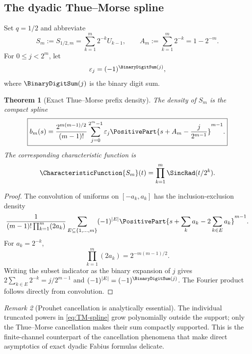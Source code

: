 \documentclass[11pt,oneside]{article}
\newtheorem{theorem}{Theorem}[section]
\theoremstyle{definition}
\theoremstyle{remark}
\newtheorem{remark}[theorem]{Remark}
\newcommand{\epsTM}{\varepsilon}
\begin{document}
\subsection{The dyadic Thue--Morse spline}

Set $q=1/2$ and abbreviate
\begin{equation}
 S_m:=S_{1/2,m}=\sum_{k=1}^{m}2^{-k}U_{k-1},
 \qquad A_m:=\sum_{k=1}^{m}2^{-k}=1-2^{-m}.
 \label{eq:dyadic-prefix}
\end{equation}
For $0\le j<2^m$, let
\begin{equation}
 \epsTM_j=(-1)^{\BinaryDigitSum(j)},
 \label{eq:TM-sign}
\end{equation}
where $\BinaryDigitSum(j)$ is the binary digit sum.

\begin{theorem}[Exact Thue--Morse prefix density]
\label{thm:TM-spline}
The density of $S_m$ is the compact spline
\begin{equation}
 \boxed{
 b_m(s)=\frac{2^{m(m-1)/2}}{(m-1)!}
 \sum_{j=0}^{2^m-1}\epsTM_j
 \PositivePart{s+A_m-\frac{j}{2^{m-1}}}^{m-1}.}
 \label{eq:TM-spline}
\end{equation}
The corresponding characteristic function is
\begin{equation}
 \CharacteristicFunction{S_m}(t)=\prod_{k=1}^{m}\SincRad(t/2^k).
 \label{eq:dyadic-finite-sinc}
\end{equation}
\end{theorem}

\begin{proof}
The convolution of uniforms on $[-a_k,a_k]$ has the inclusion-exclusion density
\[
 \frac{1}{(m-1)!\prod_{k=1}^{m}(2a_k)}
 \sum_{E\subseteq\{1,\ldots,m\}}(-1)^{|E|}
 \PositivePart{s+\sum_ka_k-2\sum_{k\in E}a_k}^{m-1}.
\]
For $a_k=2^{-k}$,
\[
 \prod_{k=1}^{m}(2a_k)=2^{-m(m-1)/2}.
\]
Writing the subset indicator as the binary expansion of $j$ gives
$2\sum_{k\in E}2^{-k}=j/2^{m-1}$ and $(-1)^{|E|}=(-1)^{\BinaryDigitSum(j)}$.
The Fourier product follows directly from convolution.
\end{proof}

\begin{remark}[Prouhet cancellation is analytically essential]
The individual truncated powers in \eqref{eq:TM-spline} grow polynomially outside
the support; only the Thue--Morse cancellation makes their sum compactly
supported.  This is the finite-channel counterpart of the cancellation phenomena
that make direct asymptotics of exact dyadic Fabius formulas delicate.
\end{remark}
\end{document}
